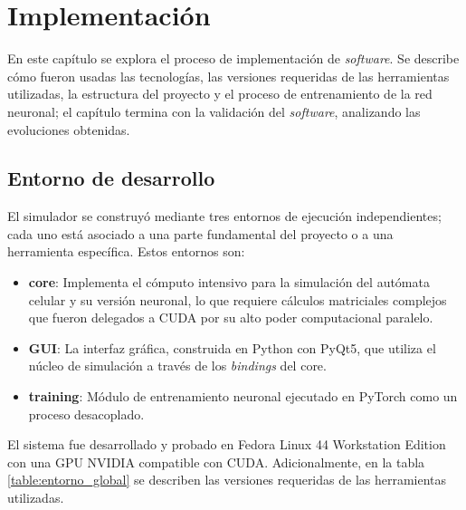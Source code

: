 \chapter{Implementación}


En este capítulo se explora el proceso de implementación de \textit{software}. Se describe cómo fueron usadas las tecnologías, las versiones requeridas de las herramientas utilizadas, la estructura del proyecto y el proceso de entrenamiento de la red neuronal; el capítulo termina con la validación del \textit{software}, analizando las evoluciones obtenidas.

\section{Entorno de desarrollo}

El simulador se construyó mediante tres entornos de ejecución independientes; cada uno está asociado a una parte fundamental del proyecto o a una herramienta específica. Estos entornos son: 

\begin{itemize}
	\item \textbf{core}: Implementa el cómputo intensivo para la simulación del autómata celular y su versión neuronal, lo que requiere cálculos matriciales complejos que fueron delegados a CUDA por su alto poder computacional paralelo. 
	
	\item \textbf{GUI}: La interfaz gráfica, construida en Python con PyQt5, que utiliza el núcleo de simulación a través de los \textit{bindings} del core. 
	
	\item \textbf{training}: Módulo de entrenamiento neuronal ejecutado en PyTorch como un proceso desacoplado.
	
\end{itemize}

El sistema fue desarrollado y probado en Fedora Linux 44 Workstation Edition con una GPU NVIDIA compatible con CUDA. Adicionalmente, en la tabla \ref{table:entorno_global} se describen las versiones requeridas de las herramientas utilizadas.

